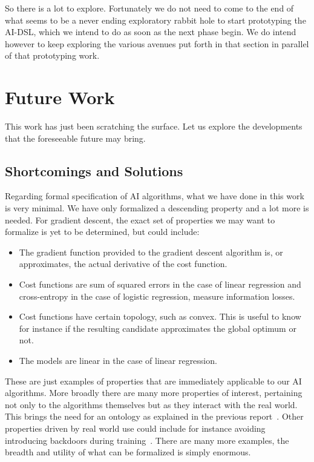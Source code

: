 \documentclass[]{report}
\begin{document}
So there is a lot to explore.  Fortunately we do not need to come to
the end of what seems to be a never ending exploratory rabbit hole to
start prototyping the AI-DSL, which we intend to do as soon as the
next phase begin.  We do intend however to keep exploring the various
avenues put forth in that section in parallel of that prototyping
work.

\section{Future Work}
This work has just been scratching the surface.  Let us explore the
developments that the foreseeable future may bring.

\subsection{Shortcomings and Solutions}
Regarding formal specification of AI algorithms, what we have done in
this work is very minimal.  We have only formalized a descending
property and a lot more is needed.  For gradient descent, the exact
set of properties we may want to formalize is yet to be determined,
but could include:
\begin{itemize}
\item The gradient function provided to the gradient descent algorithm
  is, or approximates, the actual derivative of the cost function.
\item Cost functions are sum of squared errors in the case of linear
  regression and cross-entropy in the case of logistic regression,
  measure information losses.
\item Cost functions have certain topology, such as convex.  This is
  useful to know for instance if the resulting candidate approximates
  the global optimum or not.
\item The models are linear in the case of linear regression.
\end{itemize}
These are just examples of properties that are immediately applicable
to our AI algorithms.  More broadly there are many more properties of
interest, pertaining not only to the algorithms themselves but as they
interact with the real world.  This brings the need for an ontology as
explained in the previous report~\cite{AIDSLReport2021}.  Other
properties driven by real world use could include for instance
avoiding introducing backdoors during training~\cite{Menisov2022}.
There are many more examples, the breadth and utility of what can be
formalized is simply enormous.
\end{document}
